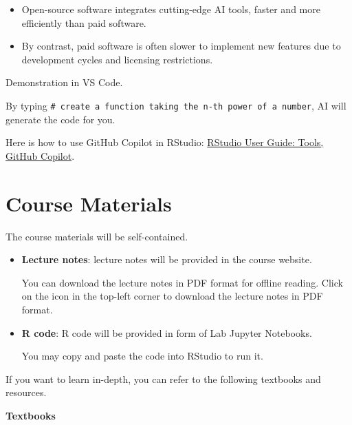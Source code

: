 \documentclass[
  12pt,
  letterpaper,
]{scrbook}
\providecommand{\tightlist}{%
  \setlength{\itemsep}{0pt}\setlength{\parskip}{0pt}}
\renewcommand{\tightlist}{\setlength{\itemsep}{0.5\baselineskip}\setlength{\parskip}{0.2\baselineskip}}
\theoremstyle{plain}
\theoremstyle{definition}
\theoremstyle{remark}
\begin{document}
\begin{itemize}
\tightlist
\item
  Open-source software integrates cutting-edge AI tools, faster and more
  efficiently than paid software.
\item
  By contrast, paid software is often slower to implement new features
  due to development cycles and licensing restrictions.
\end{itemize}

{ Demonstration in VS Code. }

By typing
\texttt{\#\ create\ a\ function\ taking\ the\ n-th\ power\ of\ a\ number},
AI will generate the code for you.

Here is how to use GitHub Copilot in RStudio:
\href{https://docs.posit.co/ide/user/ide/guide/tools/copilot.html\#using-copilot}{RStudio
User Guide: Tools, GitHub Copilot}.

\section{Course Materials}\label{course-materials}

The course materials will be self-contained.

\begin{itemize}
\item
  \textbf{Lecture notes}: lecture notes will be provided in the course
  website.

  You can download the lecture notes in PDF format for offline reading.
  Click on the icon in the top-left corner to download the lecture notes
  in PDF format.
\item
  \textbf{R code}: R code will be provided in form of Lab Jupyter
  Notebooks.

  You may copy and paste the code into RStudio to run it.
\end{itemize}

If you want to learn in-depth, you can refer to the following textbooks
and resources.

\textbf{Textbooks}
\end{document}
